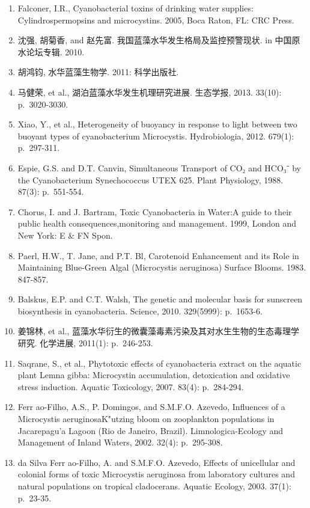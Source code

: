 \documentclass[
]{book}
\begin{document}
\begin{enumerate}
\def\labelenumi{\arabic{enumi}.}
\item
  Falconer, I.R., Cyanobacterial toxins of drinking water supplies: Cylindrospermopsins and microcystins. 2005, Boca Raton, FL: CRC Press.
\item
  沈强, 胡菊香, and 赵先富. 我国蓝藻水华发生格局及监控预警现状. in 中国原水论坛专辑. 2010.
\item
  胡鸿钧, 水华蓝藻生物学. 2011: 科学出版社.
\item
  马健荣, et al., 湖泊蓝藻水华发生机理研究进展. 生态学报, 2013. 33(10): p.~3020-3030.
\item
  Xiao, Y., et al., Heterogeneity of buoyancy in response to light between two buoyant types of cyanobacterium Microcystis. Hydrobiologia, 2012. 679(1): p.~297-311.
\item
  Espie, G.S. and D.T. Canvin, Simultaneous Transport of CO₂ and HCO₃⁻ by the Cyanobacterium Synechococcus UTEX 625. Plant Physiology, 1988. 87(3): p.~551-554.
\item
  Chorus, I. and J. Bartram, Toxic Cyanobacteria in Water:A guide to their public health consequences,monitoring and management. 1999, London and New York: E \& FN Spon.
\item
  Paerl, H.W., T. Jane, and P.T. Bl, Carotenoid Enhancement and its Role in Maintaining Blue-Green Algal (Microcystis aeruginosa) Surface Blooms. 1983. 847-857.
\item
  Balskus, E.P. and C.T. Walsh, The genetic and molecular basis for sunscreen biosynthesis in cyanobacteria. Science, 2010. 329(5999): p.~1653-6.
\item
  姜锦林, et al., 蓝藻水华衍生的微囊藻毒素污染及其对水生生物的生态毒理学研究. 化学进展, 2011(1): p.~246-253.
\item
  Saqrane, S., et al., Phytotoxic effects of cyanobacteria extract on the aquatic plant Lemna gibba: Microcystin accumulation, detoxication and oxidative stress induction. Aquatic Toxicology, 2007. 83(4): p.~284-294.
\item
  Ferr ao-Filho, A.S., P. Domingos, and S.M.F.O. Azevedo, Influences of a Microcystis aeruginosaK"utzing bloom on zooplankton populations in Jacarepagu'a Lagoon (Rio de Janeiro, Brazil). Limnologica-Ecology and Management of Inland Waters, 2002. 32(4): p.~295-308.
\item
  da Silva Ferr ao-Filho, A. and S.M.F.O. Azevedo, Effects of unicellular and colonial forms of toxic Microcystis aeruginosa from laboratory cultures and natural populations on tropical cladocerans. Aquatic Ecology, 2003. 37(1): p.~23-35.

\end{enumerate}
\end{document}
